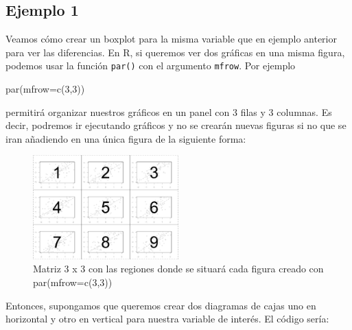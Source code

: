 \documentclass[
]{book}
\newenvironment{Shaded}{\begin{snugshade}}{\end{snugshade}}
\newcommand{\AttributeTok}[1]{\textcolor[rgb]{0.77,0.63,0.00}{#1}}
\newcommand{\ConstantTok}[1]{\textcolor[rgb]{0.00,0.00,0.00}{#1}}
\newcommand{\DecValTok}[1]{\textcolor[rgb]{0.00,0.00,0.81}{#1}}
\newcommand{\FunctionTok}[1]{\textcolor[rgb]{0.00,0.00,0.00}{#1}}
\newcommand{\NormalTok}[1]{#1}
\newcommand{\SpecialCharTok}[1]{\textcolor[rgb]{0.00,0.00,0.00}{#1}}
\newcommand{\StringTok}[1]{\textcolor[rgb]{0.31,0.60,0.02}{#1}}
\begin{document}
\hypertarget{ejemplo-1-1}{%
\subsection*{Ejemplo 1}\label{ejemplo-1-1}}

Veamos cómo crear un boxplot para la misma variable que en ejemplo anterior para ver las diferencias. En R, si queremos ver dos gráficas en una misma figura, podemos usar la función \texttt{par()} con el argumento \texttt{mfrow}. Por ejemplo

\begin{Shaded}
\begin{Highlighting}[]
\FunctionTok{par}\NormalTok{(}\AttributeTok{mfrow=}\FunctionTok{c}\NormalTok{(}\DecValTok{3}\NormalTok{,}\DecValTok{3}\NormalTok{))}
\end{Highlighting}
\end{Shaded}

permitirá organizar nuestros gráficos en un panel con 3 filas y 3 columnas. Es decir, podremos ir ejecutando gráficos y no se crearán nuevas figuras si no que se iran añadiendo en una única figura de la siguiente forma:

\begin{figure}
\centering
\includegraphics[width=0.5\textwidth,height=\textheight]{figures/panel.png}
\caption{Matriz 3 x 3 con las regiones donde se situará cada figura creado con par(mfrow=c(3,3))}
\end{figure}

Entonces, supongamos que queremos crear dos diagramas de cajas uno en horizontal y otro en vertical para nuestra variable de interés. El código sería:

\begin{Shaded}
\end{Shaded}
\end{document}
